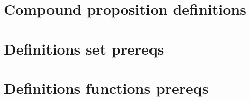 
\section*{Compound proposition definitions}

\vfill
\section*{Definitions set prereqs}

\vfill
\section*{Definitions functions prereqs}

\vfill

